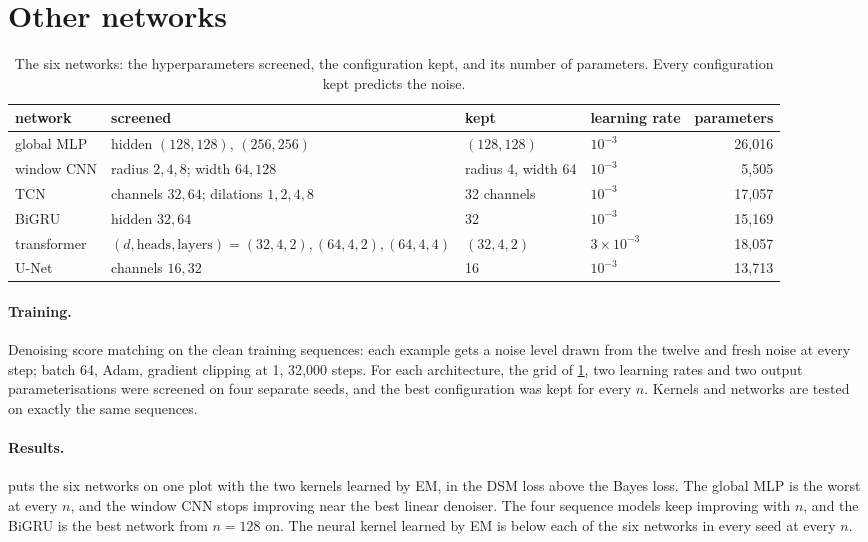 \documentclass{article}
\begin{document}
\section{Other networks}
\label{app:networks}

\begin{table}[!htbp]
  \caption{The six networks: the hyperparameters screened, the configuration kept, and its number of parameters. Every
  configuration kept predicts the noise.}
  \label{tab:networks}
  \centering
  \small
  \begin{tabular}{@{}llll r@{}}
    \toprule
    network & screened & kept & learning rate & parameters\\
    \midrule
    global MLP   & hidden $(128,128)$, $(256,256)$ & $(128,128)$ & $10^{-3}$ & 26{,}016\\
    window CNN   & radius $2,4,8$; width $64,128$ & radius 4, width 64 & $10^{-3}$ & 5{,}505\\
    TCN          & channels $32,64$; dilations $1,2,4,8$ & 32 channels & $10^{-3}$ & 17{,}057\\
    BiGRU        & hidden $32,64$ & 32 & $10^{-3}$ & 15{,}169\\
    transformer  & $(d,\text{heads},\text{layers})=(32,4,2),(64,4,2),(64,4,4)$ & $(32,4,2)$ & $3\times10^{-3}$ & 18{,}057\\
    U-Net        & channels $16,32$ & 16 & $10^{-3}$ & 13{,}713\\
    \bottomrule
  \end{tabular}
\end{table}

\paragraph{Training.} Denoising score matching on the clean training sequences: each example gets a noise level drawn
from the twelve and fresh noise at every step; batch 64, Adam, gradient clipping at 1, 32{,}000 steps. For each
architecture, the grid of \cref{tab:networks}, two learning rates and two output parameterisations were screened on
four separate seeds, and the best configuration was kept for every $n$. Kernels and networks are tested on exactly the
same sequences.

\paragraph{Results.}  puts the six networks on one plot with the two kernels learned by EM, in the
DSM loss above the Bayes loss. The global MLP is the worst at every $n$, and the window CNN stops improving near the best
linear denoiser. The four sequence models keep improving with $n$, and the BiGRU is the best network from $n=128$ on. The
neural kernel learned by EM is below each of the six networks in every seed at every $n$.
\end{document}
